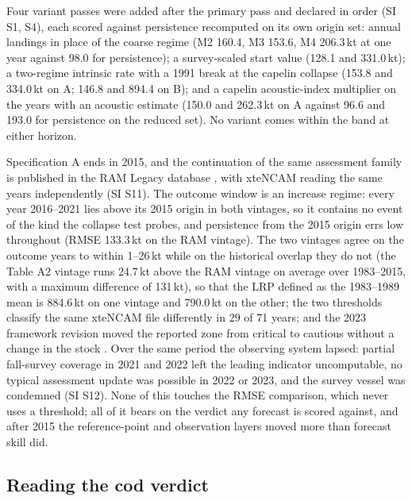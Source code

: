 Four variant passes were added after the primary pass and declared in order (SI S1, S4), each scored against persistence recomputed on its own origin set: annual landings in place of the coarse regime (M2 160.4, M3 153.6, M4 206.3\,kt at one year against 98.0 for persistence); a survey-scaled start value (128.1 and 331.0\,kt); a two-regime intrinsic rate with a 1991 break at the capelin collapse \citep{Buren2014,DFO2024b} (153.8 and 334.0\,kt on A; 146.8 and 894.4 on B); and a capelin acoustic-index multiplier on the years with an acoustic estimate \citep{Murphy2025,NAFC2025} (150.0 and 262.3\,kt on A against 96.6 and 193.0 for persistence on the reduced set). No variant comes within the band at either horizon.

Specification A ends in 2015, and the continuation of the same assessment family is published in the RAM Legacy database \citep[v4.66, stock COD2J3KL;][]{Ricard2012}, with xteNCAM reading the same years independently (SI S11). The outcome window is an increase regime: every year 2016--2021 lies above its 2015 origin in both vintages, so it contains no event of the kind the collapse test probes, and persistence from the 2015 origin errs low throughout (RMSE 133.3\,kt on the RAM vintage). The two vintages agree on the outcome years to within 1--26\,kt while on the historical overlap they do not (the Table A2 vintage runs 24.7\,kt above the RAM vintage on average over 1983--2015, with a maximum difference of 131\,kt), so that the LRP defined as the 1983--1989 mean is 884.6\,kt on one vintage and 790.0\,kt on the other; the two thresholds classify the same xteNCAM file differently in 29 of 71 years; and the 2023 framework revision moved the reported zone from critical to cautious without a change in the stock \citep{DFO2024a,Regular2025}. Over the same period the observing system lapsed: partial fall-survey coverage in 2021 and 2022 left the leading indicator uncomputable, no typical assessment update was possible in 2022 or 2023, and the survey vessel was condemned (SI S12). None of this touches the RMSE comparison, which never uses a threshold; all of it bears on the verdict any forecast is scored against, and after 2015 the reference-point and observation layers moved more than forecast skill did.

\subsection{Reading the cod verdict}\label{sec:codreading}

